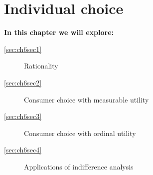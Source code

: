 \chapter{Individual choice} \label{chap:individualchoice}

\begin{topics}
\textbf{In this chapter we will explore:}
\begin{description}
\item[\ref{sec:ch6sec1}] Rationality
\item[\ref{sec:ch6sec2}] Consumer choice with measurable utility
\item[\ref{sec:ch6sec3}] Consumer choice with ordinal utility
\item[\ref{sec:ch6sec4}] Applications of indifference analysis
\end{description}
\end{topics}